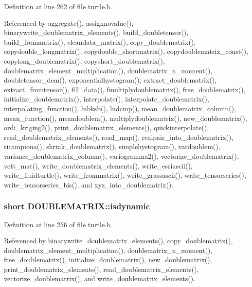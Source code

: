 Definition at line 262 of file turtle.\-h.



Referenced by aggregate(), assignnovalue(), binarywrite\-\_\-doublematrix\-\_\-elements(), build\-\_\-doubletensor(), build\-\_\-frommatrix(), cleandata\-\_\-matrix(), copy\-\_\-doublematrix(), copydouble\-\_\-longmatrix(), copydouble\-\_\-shortmatrix(), copydoublematrix\-\_\-const(), copylong\-\_\-doublematrix(), copyshort\-\_\-doublematrix(), doublematrix\-\_\-element\-\_\-multiplication(), doublematrix\-\_\-n\-\_\-moment(), doubletensor\-\_\-dem(), exponentialhystogram(), extract\-\_\-doublematrix(), extract\-\_\-fromtensor(), fill\-\_\-data(), fmultiplydoublematrix(), free\-\_\-doublematrix(), initialize\-\_\-doublematrix(), interpolate(), interpolate\-\_\-doublematrix(), interpolating\-\_\-function(), lubksb(), ludcmp(), mean\-\_\-doublematrix\-\_\-column(), mean\-\_\-function(), meandoublem(), multiplydoublematrix(), new\-\_\-doublematrix(), ordi\-\_\-kriging2(), print\-\_\-doublematrix\-\_\-elements(), quickinterpolate(), read\-\_\-doublematrix\-\_\-elements(), read\-\_\-map(), realpair\-\_\-into\-\_\-doublematrix(), ricampiona(), shrink\-\_\-doublematrix(), simplehystogram(), vardoublem(), variance\-\_\-doublematrix\-\_\-column(), variogramma2(), vectorize\-\_\-doublematrix(), vett\-\_\-mat(), write\-\_\-doublematrix\-\_\-elements(), write\-\_\-esriascii(), write\-\_\-fluidturtle(), write\-\_\-frommatrix(), write\-\_\-grassascii(), write\-\_\-tensorseries(), write\-\_\-tensorseries\-\_\-bis(), and xyz\-\_\-into\-\_\-doublematrix().

\hypertarget{struct_d_o_u_b_l_e_m_a_t_r_i_x_a1e62e4f9e5746683445d8ff382a182e1}{
\subsubsection[{isdynamic}]{\setlength{\rightskip}{0pt plus 5cm}short D\-O\-U\-B\-L\-E\-M\-A\-T\-R\-I\-X\-::isdynamic}}\label{struct_d_o_u_b_l_e_m_a_t_r_i_x_a1e62e4f9e5746683445d8ff382a182e1}


Definition at line 256 of file turtle.\-h.



Referenced by binarywrite\-\_\-doublematrix\-\_\-elements(), copy\-\_\-doublematrix(), doublematrix\-\_\-element\-\_\-multiplication(), doublematrix\-\_\-n\-\_\-moment(), free\-\_\-doublematrix(), initialize\-\_\-doublematrix(), new\-\_\-doublematrix(), print\-\_\-doublematrix\-\_\-elements(), read\-\_\-doublematrix\-\_\-elements(), vectorize\-\_\-doublematrix(), and write\-\_\-doublematrix\-\_\-elements().

